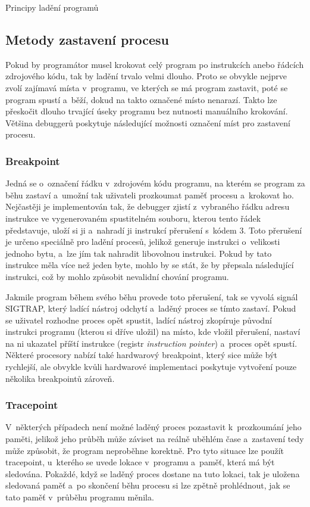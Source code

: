 \documentclass[czech,bachelor,male,python,dept460,hidelinks]{diploma}						%
\newcommand{\parspace}[1][]{
	\ifthenelse{\isempty{#1}}{\vspace{0mm}}{\vspace{#1}}
	\par
}
\begin{document}
\begin{section}{Principy ladění programů}
	\subsection{Metody zastavení procesu}
		Pokud by programátor musel krokovat celý program po instrukcích anebo řádcích zdrojového kódu, tak by ladění trvalo velmi dlouho.
		Proto se obvykle nejprve zvolí zajímavá místa v~programu, ve kterých se má program zastavit, poté se program spustí a~běží, dokud na takto označené místo
		nenarazí. Takto lze přeskočit dlouho trvající úseky programu bez nutnosti manuálního krokování. Většina debuggerů poskytuje následující možnosti označení
		míst pro zastavení procesu.
		
		\subsubsection{Breakpoint}
			Jedná se o~označení řádku v~zdrojovém kódu programu, na kterém se program za běhu zastaví a~umožní tak uživateli prozkoumat paměť procesu a~krokovat ho.
			Nejčastěji je implementován tak, že debugger zjistí z~vybraného řádku adresu instrukce ve vygenerovaném spustitelném souboru, kterou tento
			řádek představuje, uloží si ji a~nahradí ji instrukcí přerušení s~kódem 3. Toto přerušení je určeno speciálně pro ladění procesů, jelikož generuje
			instrukci o~velikosti jednoho bytu, a~lze jím tak nahradit libovolnou instrukci. \cite[306]{intel} Pokud by tato instrukce měla více než jeden byte,
			mohlo by se stát, že by přepsala následující instrukci, což by mohlo způsobit nevalidní chování programu.
			
			\parspace Jakmile program během svého běhu
			provede toto přerušení, tak se vyvolá signál SIGTRAP, který ladící nástroj odchytí a~laděný proces se tímto zastaví. Pokud se uživatel rozhodne proces
			opět spustit, ladící nástroj zkopíruje původní instrukci programu (kterou si dříve uložil) na místo, kde vložil přerušení, nastaví na ni ukazatel
			příští instrukce (registr \textit{instruction pointer}) a~proces opět spustí. \cite{eli-breakpoints}
			Některé procesory nabízí také hardwarový breakpoint, který sice může být rychlejší, ale obvykle kvůli hardwarové implementaci poskytuje
			vytvoření pouze několika breakpointů zároveň.
		\subsubsection{Tracepoint}
			V~některých případech není možné laděný proces pozastavit k~prozkoumání jeho paměti, jelikož jeho průběh může záviset na reálně uběhlém čase a~zastavení
			tedy může způsobit, že program neproběhne korektně. Pro tyto situace lze použít tracepoint, u~kterého se uvede lokace v~programu a~paměť, která má být
			sledována. Pokaždé, když se laděný proces dostane na tuto lokaci, tak je uložena sledovaná paměť a~po skončení běhu procesu si lze zpětně prohlédnout,
			jak se tato paměť v~průběhu programu měnila.

\end{section}
\end{document}
